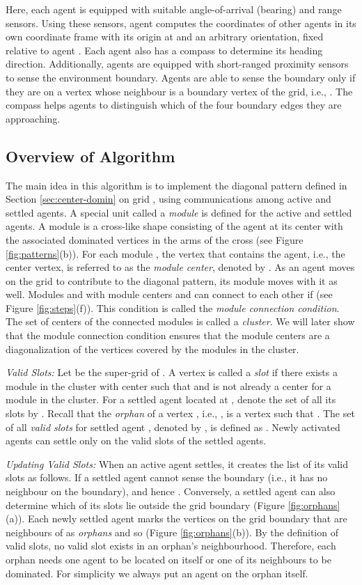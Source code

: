 \documentclass[letterpaper, 10pt, conference]{ieeeconf}
\theoremstyle{definition}
\theoremstyle{remark}
\begin{document}
Here, each agent is equipped with suitable angle-of-arrival (bearing) and range sensors. Using these sensors, agent  computes the coordinates of other agents in its own coordinate frame  with its origin at  and an arbitrary orientation, fixed relative to agent . Each agent also has a compass to determine its heading direction. Additionally, agents are equipped with short-ranged proximity sensors to sense the environment boundary. Agents are able to sense the boundary only if they are on a vertex  whose neighbour is a boundary vertex of the grid, i.e., . The compass helps agents to distinguish which of the four boundary edges they are approaching. 


\subsection{Overview of Algorithm}
\label{subsec:dist-alg-summary}
The main idea in this algorithm is to implement the diagonal pattern defined in Section \ref{sec:center-domin} on grid , using communications among active and settled agents. A special unit called a \emph{module} is defined for the active and settled agents. A module is a cross-like shape consisting of the agent at its center with the associated dominated vertices in the arms of the cross (see Figure \ref{fig:patterns}(b)).
For each module , the vertex that contains the agent, i.e., the center vertex, is referred to as the \emph{module center}, denoted by . As an agent moves on the grid to contribute to the diagonal pattern, its module moves with it as well. Modules  and  with module centers  and  can connect to each other if  (see Figure \ref{fig:steps}(f)). This condition is called the \emph{module connection condition}. The set of centers of the connected modules is called a \emph{cluster}. We will later show that the module connection condition ensures that the module centers are a diagonalization of the vertices covered by the modules in the cluster.


\emph{Valid Slots:} Let  be the super-grid of . A vertex  is called a \emph{slot} if there exists a module  in the cluster with center  such that  and  is not already a center for a module in the cluster.
For a settled agent  located at , denote the set of all its slots by . Recall that the \emph{orphan} of a vertex , i.e., , is a vertex  such that . The set of all \emph{valid slots} for settled agent , denoted by , is defined as . Newly activated agents can settle only on the valid slots of the settled agents.


\emph{Updating Valid Slots:} When an active agent settles, it creates the list of its valid slots as follows. If a settled agent  cannot sense the boundary (i.e., it has no neighbour on the boundary),  and hence . Conversely, a settled agent can also determine which of its slots lie outside the grid boundary (Figure \ref{fig:orphans}(a)). Each newly settled agent marks the vertices on the grid boundary that are neighbours of  as \emph{orphans} and so  (Figure \ref{fig:orphans}(b)). By the definition of valid slots, no valid slot exists in an orphan's neighbourhood. Therefore, each orphan needs one agent to be located on itself or one of its neighbours to be dominated. For simplicity we always put an agent on the orphan itself.
\end{document}
